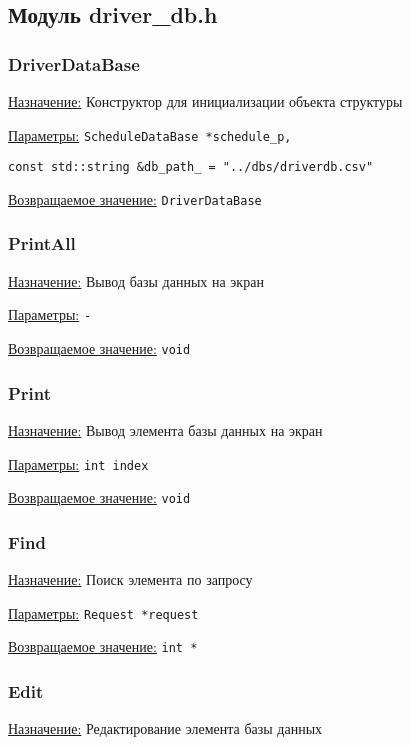 \subsection{Модуль driver\_db.h}


\subsubsection{DriverDataBase}

\underline{Назначение:} 
Конструктор для инициализации объекта структуры

\underline{Параметры:} 
\verb|ScheduleDataBase *schedule_p,|

\verb|const std::string &db_path_ = "../dbs/driverdb.csv"|

\underline{Возвращаемое значение:} \verb|DriverDataBase|


\subsubsection{PrintAll}

\underline{Назначение:}
Вывод базы данных на экран

\underline{Параметры:} \verb|-|

\underline{Возвращаемое значение:} \verb|void|


\subsubsection{Print}

\underline{Назначение:}
Вывод элемента базы данных на экран

\underline{Параметры:} \verb|int index|

\underline{Возвращаемое значение:} \verb|void|


\subsubsection{Find}

\underline{Назначение:}
Поиск элемента по запросу

\underline{Параметры:} \verb|Request *request|

\underline{Возвращаемое значение:} \verb|int *|


\subsubsection{Edit}

\underline{Назначение:}
Редактирование элемента базы данных

